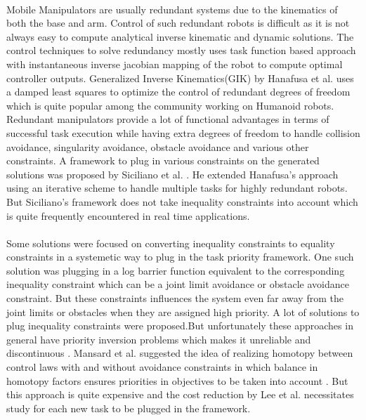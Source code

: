 \paragraph{}
  Mobile Manipulators are usually redundant systems due to the kinematics of both the base and arm. Control of such redundant robots is difficult as it is not always easy to compute analytical inverse kinematic and dynamic solutions. The control techniques to solve redundancy mostly uses task function based approach with instantaneous inverse jacobian mapping of the robot to compute optimal controller outputs. Generalized Inverse Kinematics(GIK) by Hanafusa et al. uses a damped least squares to optimize the control of redundant degrees of freedom which is quite popular among the community working on Humanoid robots\cite{hanafusa1981analysis}. Redundant manipulators provide a lot of functional advantages in terms of successful task execution while having extra degrees of freedom to handle collision avoidance, singularity avoidance, obstacle avoidance and various other constraints. A framework to plug in various constraints on the generated solutions was proposed by Siciliano et al. \cite{siciliano1991general}.
 He extended Hanafusa's approach using an iterative scheme to handle multiple tasks for highly redundant robots. But Siciliano's framework does not take inequality constraints into account which is quite frequently encountered in real time applications. 
  
\paragraph{}  
 Some solutions were focused on converting inequality constraints to equality constraints in a systemetic way to plug in the task priority framework. One such solution was plugging in a log barrier function equivalent to the corresponding inequality constraint which can be a joint limit avoidance or obstacle avoidance constraint\cite{khatib1986real}. But these constraints influences the system even far away from the joint limits or obstacles when they are assigned high priority. A lot of solutions to plug inequality constraints were proposed.But unfortunately these approaches in general have priority inversion problems which makes it unreliable and discontinuous \cite{chan1995weighted} \cite{mansard2009directional} \cite{raunhardt2007progressive}. Mansard et al. suggested the idea of realizing homotopy between control laws with and without avoidance constraints in which balance in homotopy factors ensures priorities in objectives to be taken into account \cite{Mansard2009}. But this approach is quite expensive and the cost reduction by Lee et al. \cite{lee2012intermediate} necessitates study for each new task to be plugged in the framework.  

